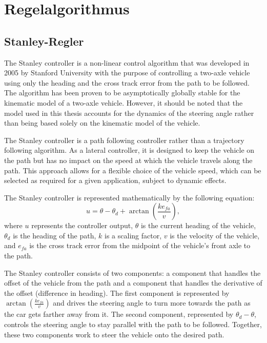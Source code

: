\documentclass[arbeit=studie,oneside,BCOR=12mm]{ArbeitRST}
\begin{document}
\chapter{Regelalgorithmus}

\section{Stanley-Regler}
The Stanley controller is a non-linear control algorithm that was developed in
2005 by Stanford University with the purpose of controlling a two-axle vehicle
using only the heading and the cross track error from the path to be followed.
The algorithm has been proven to be asymptotically globally stable for the
kinematic model of a two-axle vehicle. However, it should be noted that the
model used in this thesis accounts for the dynamics of the steering angle
rather than being based solely on the kinematic model of the vehicle.

The Stanley controller is a path following controller rather than a trajectory
following algorithm. As a lateral controller, it is designed to keep the
vehicle on the path but has no impact on the speed at which the vehicle travels
along the path. This approach allows for a flexible choice of the vehicle
speed, which can be selected as required for a given application, subject to
dynamic effects.

The Stanley controller is represented mathematically by the following equation:
\begin{equation}
    u = \theta - \theta_d + \arctan\left(\frac{ke_{fa}}{v}\right),
    \label{eq:Stanley-Regler}
\end{equation}
where $u$ represents the controller output, $\theta$ is the current heading of
the vehicle, $\theta_d$ is the heading of the path, $k$ is a scaling factor,
$v$ is the velocity of the vehicle, and $e_{fa}$ is the cross track error from
the midpoint of the vehicle's front axle to the path.

The Stanley controller consists of two components: a component that handles the
offset of the vehicle from the path and a component that handles the derivative
of the offset (difference in heading). The first component is represented by
$\arctan(\frac{ke_{fa}}{v})$ and drives the steering angle to turn more towards
the path as the car gets farther away from it. The second component,
represented by $\theta_d - \theta$, controls the steering angle to stay
parallel with the path to be followed. Together, these two components work to
steer the vehicle onto the desired path.
\end{document}
